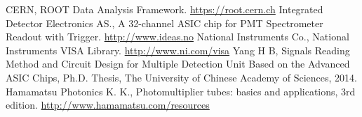 \documentclass{nst}
\begin{document}
\begin{thebibliography}{99}
	 CERN,  ROOT Data Analysis Framework. \href{https://root.cern.ch/}{https://root.cern.ch}
	 Integrated Detector Electronics AS., A 32-channel ASIC chip for PMT Spectrometer Readout with Trigger. \href{http://www.ideas.no/products/ide3160-2/}{http://www.ideas.no}
	 National Instruments Co.,  National Instruments {VISA} Library. \href{http://www.ni.com/visa/}{http://www.ni.com/visa}
	 Yang H B, Signals Reading Method and Circuit Design for Multiple Detection Unit Based on the Advanced {ASIC} Chips, Ph.D. Thesis, The University of Chinese Academy of Sciences, 2014.
	 Hamamatsu Photonics K. K., Photomultiplier tubes: basics and applications, 3rd edition.
	\href{http://www.hamamatsu.com/resources/pdf/etd/PMT_handbook_v3aE.pdf}{http://www.hamamatsu.com/resources}
\end{thebibliography}


%
\end{document}
